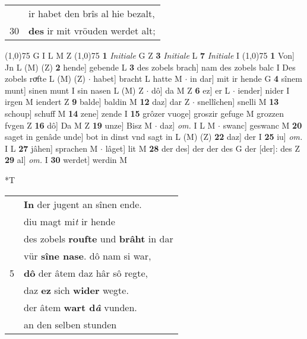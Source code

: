 \documentclass[8pt,a4paper,notitlepage]{article}
\begin{document}
\begin{table}[ht]
\begin{minipage}[t]{0.5\linewidth}
\begin{tabular}{rl}
 & ir habet den brîs al hie bezalt,\\ 
30 & \textbf{des} ir mit vröuden werdet alt;\\ 
\end{tabular}
\scriptsize
\line(1,0){75} \newline
G I L M Z \newline
\line(1,0){75} \newline
\textbf{1} \textit{Initiale} G Z  \textbf{3} \textit{Initiale} L  \textbf{7} \textit{Initiale} I  \newline
\line(1,0){75} \newline
\textbf{1} Von] Jn L (M) (Z) \textbf{2} hende] gebende L \textbf{3} des zobels brach] nam des zobels balc I Des zobels roͮfte L (M) (Z)  $\cdot$ habet] bracht L hatte M  $\cdot$ in dar] mit ir hende G \textbf{4} sînem munt] sinen munt I sin nasen L (M) Z  $\cdot$ dô] da M Z \textbf{6} ez] er L  $\cdot$ iender] nider I irgen M iendert Z \textbf{9} balde] baldin M \textbf{12} daz] dar Z  $\cdot$ snellîchen] snelli M \textbf{13} schoup] schuff M \textbf{14} zene] zende I \textbf{15} grôzer vuoge] groszir gefuge M grozzen fvgen Z \textbf{16} dô] Da M Z \textbf{19} unze] Bisz M  $\cdot$ daz] \textit{om.} I L M  $\cdot$ swanc] geswanc M \textbf{20} saget in genâde unde] bot in dinst vnd sagt in L (M) (Z) \textbf{22} daz] der I \textbf{25} iu] \textit{om.} I L \textbf{27} jâhen] sprachen M  $\cdot$ lâget] lit M \textbf{28} der des] der der des G der [der]: des Z \textbf{29} al] \textit{om.} I \textbf{30} werdet] werdin M \newline
\end{minipage}
\hspace{0.5cm}
\begin{minipage}[t]{0.5\linewidth}
\small
\begin{center}*T
\end{center}
\begin{tabular}{rl}
 & \textbf{In} der jugent an sînen ende.\\ 
 & diu magt mi\textit{t} ir hende\\ 
 & des zobels \textbf{roufte} und \textbf{brâht} in dar\\ 
 & vür \textbf{sîne nase}. dô nam si war,\\ 
5 & \textbf{dô} der âtem daz hâr sô regte,\\ 
 & daz \textbf{ez} sich \textbf{wider} wegte.\\ 
 & der âtem \textbf{wart d\textit{â}} vunden.\\ 
 & an den selben stunden\\ 

\end{tabular}
\end{minipage}
\end{table}
\end{document}
